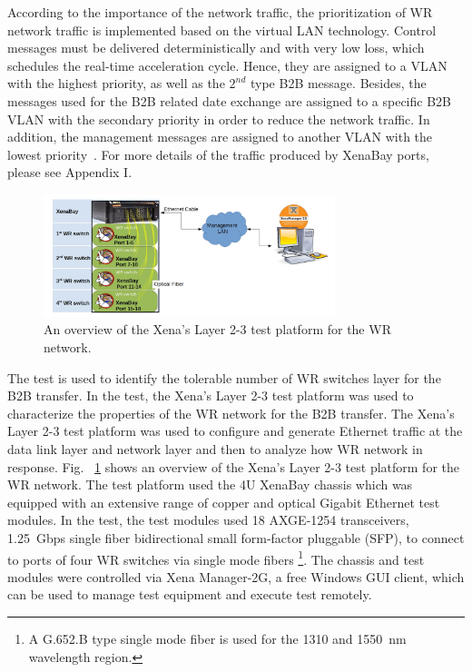 According to the importance of the network traffic, the prioritization of WR network traffic is implemented based on the virtual LAN technology. Control messages must be delivered deterministically and with very low loss, which schedules the real-time acceleration cycle. Hence, they are assigned to a VLAN with the highest priority, as well as the $2^\mathit{nd}$ type B2B message. Besides, the messages used for the B2B related date exchange are assigned to a specific B2B VLAN with the secondary priority in order to reduce the network traffic. In addition, the management messages are assigned to another VLAN with the lowest priority~\cite{prados_testing_2016}. For more details of the traffic produced by XenaBay ports, please see Appendix I.


\begin{figure}[!htb]
   \centering   
   \includegraphics*[width=85mm]{network_B2B2.jpg}
   \caption{An overview of the Xena's Layer 2-3 test platform for the WR network.}
   \label{network_B2B2}
\end{figure}
The test is used to identify the tolerable number of WR switches layer for the B2B transfer. In the test, the Xena's Layer 2-3 test platform was used to characterize the properties of the WR network for the B2B transfer. The Xena's Layer 2-3 test platform was used to configure and generate Ethernet traffic at the data link layer and network layer and then to analyze how WR network in response. Fig. ~\ref{network_B2B2} shows an overview of the Xena's Layer 2-3 test platform for the WR network. The test platform used the 4U XenaBay chassis which was equipped with an extensive range of copper and optical Gigabit Ethernet test modules. In the test, the test modules used 18 AXGE-1254 transceivers, \SI{1.25}{Gbps} single fiber bidirectional small form-factor pluggable (SFP), to connect to ports of four WR switches via single mode fibers \footnote{A G.652.B type single mode fiber is used for the 1310 and \SI{1550}{nm} wavelength region.}. The chassis and test modules were controlled via Xena Manager-2G, a free Windows GUI client, which can be used to manage test equipment and execute test remotely. 

